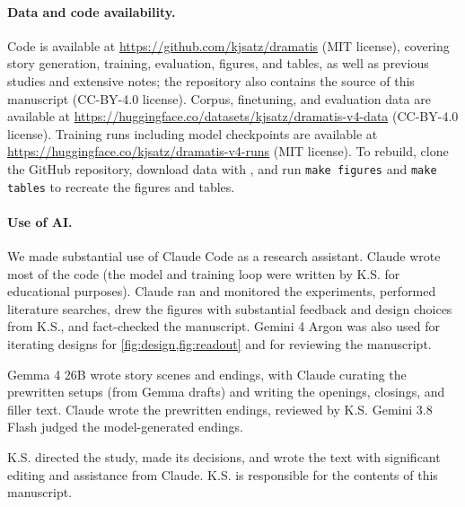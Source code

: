 \paragraph{Data and code availability.}
Code is available at \url{https://github.com/kjsatz/dramatis} (MIT license), covering story generation, training, evaluation, figures, and tables, as well as previous studies and extensive notes; the repository also contains the source of this manuscript (CC-BY-4.0 license).
Corpus, finetuning, and evaluation data are available at \url{https://huggingface.co/datasets/kjsatz/dramatis-v4-data} (CC-BY-4.0 license).
Training runs including model checkpoints are available at \url{https://huggingface.co/kjsatz/dramatis-v4-runs} (MIT license).
To rebuild, clone the GitHub repository, download data with , and run \texttt{make figures} and \texttt{make tables} to recreate the figures and tables.

\paragraph{Use of AI.}
We made substantial use of Claude Code as a research assistant. Claude wrote most of the code (the model and training loop were written by K.S. for educational purposes). Claude ran and monitored the experiments, performed literature searches, drew the figures with substantial feedback and design choices from K.S., and fact-checked the manuscript. Gemini 4 Argon was also used for iterating designs for \cref{fig:design,fig:readout} and for reviewing the manuscript.

Gemma 4 26B wrote story scenes and endings, with Claude curating the prewritten setups (from Gemma drafts) and writing the openings, closings, and filler text. Claude wrote the prewritten endings, reviewed by K.S.
Gemini 3.8 Flash judged the model-generated endings.

K.S. directed the study, made its decisions, and wrote the text with significant editing and assistance from Claude. K.S. is responsible for the contents of this manuscript.
